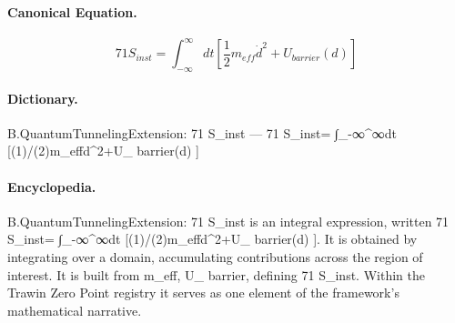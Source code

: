 \paragraph{Canonical Equation.}
\[
71 S_{inst}= \int_{-\infty}^{\infty}dt\left[\frac{1}{2}m_{eff}\dot{d}^2+U_{ barrier}(d)\right]
\]

\paragraph{Dictionary.}
B.QuantumTunnelingExtension: 71 S\_inst — 71 S\_inst= ∫\_-∞\textasciicircum{}∞dt [(1)/(2)m\_effd\textasciicircum{}2+U\_ barrier(d) ]

\paragraph{Encyclopedia.}
B.QuantumTunnelingExtension: 71 S\_inst is an integral expression, written 71 S\_inst= ∫\_-∞\textasciicircum{}∞dt [(1)/(2)m\_effd\textasciicircum{}2+U\_ barrier(d) ]. It is obtained by integrating over a domain, accumulating contributions across the region of interest. It is built from m\_eff, U\_ barrier, defining 71 S\_inst. Within the Trawin Zero Point registry it serves as one element of the framework's mathematical narrative.
